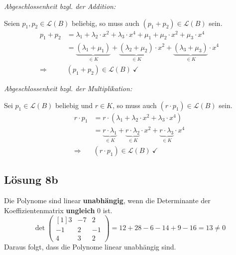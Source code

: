 \documentclass[main.tex]{subfiles}
\begin{document}
\textit{Abgeschlossenheit bzgl. der Addition:}

Seien $p_1, p_2 \in \mathcal{L}(B)$ beliebig, so muss auch $(p_1 + p_2) \in \mathcal{L}(B)$ sein.
\begin{equation*}
	\begin{array}{rl}
		p_1 + p_2 & = \lambda_1 + \lambda_2 \cdotp x^{2} + \lambda_3 \cdotp x^{4} + \mu_1 + \mu_2 \cdotp x^{2} + \mu_3 \cdotp x^{4} \\
				  & = \underbrace{(\lambda_1 +  \mu_1)}_{\in K} + \underbrace{(\lambda_2 + \mu_2)}_{\in K} \cdotp x^{2} + \underbrace{(\lambda_3 + \mu_3)}_{\in K} \cdotp x^{4} \\
		\Rightarrow & (p_1 + p_2) \in \mathcal{L}(B) \ \checkmark
	\end{array}
\end{equation*}

\textit{Abgeschlossenheit bzgl. der Multiplikation:}

Sei $p_1 \in \mathcal{L}(B)$ beliebig und $r \in K$, so muss auch $(r \cdotp p_1) \in \mathcal{L}(B)$ sein.
\begin{equation*}
	\begin{array}{rl}
		r \cdotp p_1 & = r \cdotp (\lambda_1 + \lambda_2 \cdotp x^{2} + \lambda_3 \cdotp x^{4}) \\
						& = \underbrace{r \cdotp \lambda_1}_{\in K} + 
							\underbrace{r \cdotp \lambda_2}_{\in K} \cdotp x^{2} + 
							\underbrace{r \cdotp \lambda_3}_{\in K} \cdotp x^{4} \\
		\Rightarrow & (r \cdotp p_1) \in \mathcal{L}(B) \ \checkmark
	\end{array}
\end{equation*}

\subsection{Lösung 8b}

Die Polynome sind linear \textbf{unabhängig}, wenn die Determinante der Koeffizientenmatrix \textbf{ungleich} $0$ ist.
\begin{equation*}
    \det\begin{pmatrix}[1]
    3 & -7 & 2\\
    -1 & 2 & -1\\
    4 & 3 & 2
    \end{pmatrix} = 12+28-6-14+9-16 = 13 \neq 0
\end{equation*}
Daraus folgt, dass die Polynome linear unabhängig sind.
\end{document}
